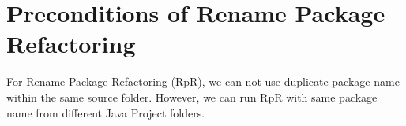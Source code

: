  \section{\textbf{Preconditions of Rename Package Refactoring}}

For Rename Package Refactoring (RpR), we can not use duplicate package name within the same source folder. However, we can run RpR with same package name from different Java Project folders.